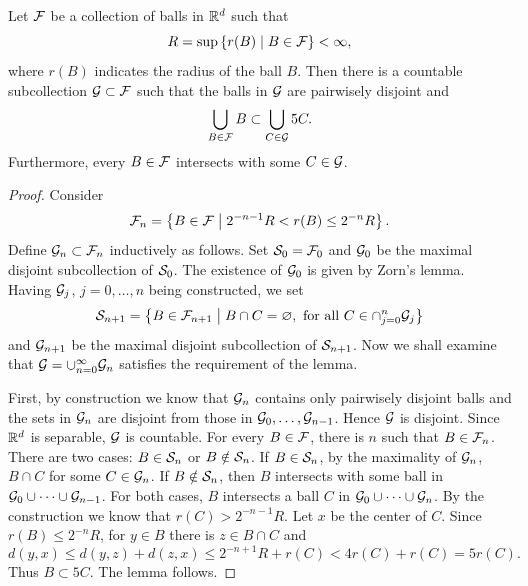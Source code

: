 \begin{lemma}
    Let $\F$ be a collection of balls in $\R^d$ such that 
    \begin{equation*}
        R = \sup\Set{r(B)}{B\in\F}<\infty, 
    \end{equation*}
    where $r(B)$ indicates the radius of the ball $B$. Then there is a 
    countable subcollection $\G\subset\F$ such that the balls in $\G$ 
    are pairwisely disjoint and  
    \begin{equation*}
        \bigcup_{B\in\F} B\subset \bigcup_{C\in\G} 5C. 
    \end{equation*}
    Furthermore, every $B\in\F$ intersects with some $C\in\G$. 
\end{lemma}
\begin{proof}
    Consider 
    \begin{equation*}
        \F_n = \Set{B\in\F}{2^{-n-1}R<r(B)\leq 2^{-n}R}.
    \end{equation*}
    Define $\G_n\subset\F_n$ inductively as follows. Set $\S_0 = \F_0$ 
    and $\G_0$ be the maximal disjoint subcollection of $\S_0$. The 
    existence of $\G_0$ is given by Zorn's lemma. Having $\G_j$, $j = 0,\ldots,n$ 
    being constructed, we set 
    \begin{equation*}
        \S_{n+1} = \Set{B\in\F_{n+1}}{B\cap C = \varnothing, \text{ for all } C\in\cap_{j=0}^n\G_j}
    \end{equation*}
    and $\G_{n+1}$ be the maximal disjoint subcollection of $\S_{n+1}$. 
    Now we shall examine that $\G = \cup_{n=0}^\infty\G_n$ satisfies the 
    requirement of the lemma. 

    First, by construction we know that $\G_n$ contains only pairwisely disjoint 
    balls and the sets in $\G_n$ are disjoint from those in $\G_{0},\ldots,\G_{n-1}$.
    Hence $\G$ is disjoint. Since $\R^d$ is separable, $\G$ is countable. 
    For every $B\in\F$, there is $n$ such that $B\in\F_n$. There are two 
    cases: $B\in\S_{n}$ or $B\notin\S_n$. If $B\in\S_n$, by the maximality 
    of $\G_n$, $B\cap C$ for some $C\in\G_{n}$. If $B\notin \S_{n}$, 
    then $B$ intersects with some ball in $\G_0\cup\cdots\cup\G_{n-1}$. 
    For both cases, $B$ intersects a ball $C$ in $\G_0\cup\cdots\cup\G_{n}$. 
    By the construction we know that $r(C)>2^{-n-1}R$. Let $x$ be the center 
    of $C$. Since $r(B)\leq 2^{-n}R$, for $y\in B$ there is $z\in B\cap C$ and 
    \begin{equation*}
        d(y,x)\leq d(y,z) + d(z,x)\leq 2^{-n+1}R + r(C)<4r(C) + r(C) = 5r(C). 
    \end{equation*} 
    Thus $B\subset 5C$. The lemma follows. 
\end{proof}

